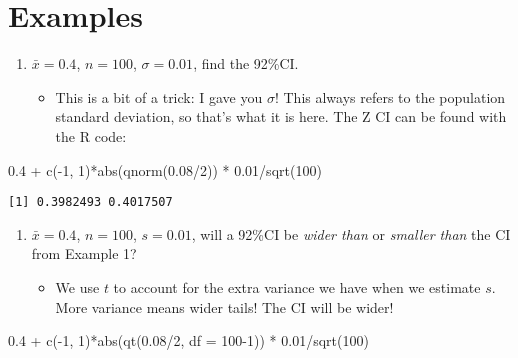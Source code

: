 \documentclass[
  letterpaper,
  DIV=11,
  numbers=noendperiod]{scrreprt}
\newenvironment{Shaded}{\begin{snugshade}}{\end{snugshade}}
\newcommand{\AttributeTok}[1]{\textcolor[rgb]{0.40,0.45,0.13}{#1}}
\newcommand{\DecValTok}[1]{\textcolor[rgb]{0.68,0.00,0.00}{#1}}
\newcommand{\FloatTok}[1]{\textcolor[rgb]{0.68,0.00,0.00}{#1}}
\newcommand{\FunctionTok}[1]{\textcolor[rgb]{0.28,0.35,0.67}{#1}}
\newcommand{\NormalTok}[1]{\textcolor[rgb]{0.00,0.23,0.31}{#1}}
\newcommand{\SpecialCharTok}[1]{\textcolor[rgb]{0.37,0.37,0.37}{#1}}
\providecommand{\tightlist}{%
  \setlength{\itemsep}{0pt}\setlength{\parskip}{0pt}}\usepackage{longtable,booktabs,array}
\begin{document}
\hypertarget{examples-5}{%
\section{Examples}\label{examples-5}}

\begin{enumerate}
\def\labelenumi{\arabic{enumi}.}
\tightlist
\item
  \(\bar x = 0.4\), \(n = 100\), \(\sigma = 0.01\), find the 92\%CI.

  \begin{itemize}
  \tightlist
  \item
    This is a bit of a trick: I gave you \(\sigma\)! This always refers
    to the population standard deviation, so that's what it is here. The
    Z CI can be found with the R code:
  \end{itemize}
\end{enumerate}

\begin{Shaded}
\begin{Highlighting}[]
\FloatTok{0.4} \SpecialCharTok{+} \FunctionTok{c}\NormalTok{(}\SpecialCharTok{{-}}\DecValTok{1}\NormalTok{, }\DecValTok{1}\NormalTok{)}\SpecialCharTok{*}\FunctionTok{abs}\NormalTok{(}\FunctionTok{qnorm}\NormalTok{(}\FloatTok{0.08}\SpecialCharTok{/}\DecValTok{2}\NormalTok{)) }\SpecialCharTok{*} \FloatTok{0.01}\SpecialCharTok{/}\FunctionTok{sqrt}\NormalTok{(}\DecValTok{100}\NormalTok{)}
\end{Highlighting}
\end{Shaded}

\begin{verbatim}
[1] 0.3982493 0.4017507
\end{verbatim}

\begin{enumerate}
\def\labelenumi{\arabic{enumi}.}
\setcounter{enumi}{1}
\tightlist
\item
  \(\bar x = 0.4\), \(n = 100\), \(s = 0.01\), will a 92\%CI be
  \emph{wider than} or \emph{smaller than} the CI from Example 1?

  \begin{itemize}
  \tightlist
  \item
    We use \(t\) to account for the extra variance we have when we
    estimate \(s\). More variance means wider tails! The CI will be
    wider!
  \end{itemize}
\end{enumerate}

\begin{Shaded}
\begin{Highlighting}[]
\FloatTok{0.4} \SpecialCharTok{+} \FunctionTok{c}\NormalTok{(}\SpecialCharTok{{-}}\DecValTok{1}\NormalTok{, }\DecValTok{1}\NormalTok{)}\SpecialCharTok{*}\FunctionTok{abs}\NormalTok{(}\FunctionTok{qt}\NormalTok{(}\FloatTok{0.08}\SpecialCharTok{/}\DecValTok{2}\NormalTok{, }\AttributeTok{df =} \DecValTok{100{-}1}\NormalTok{)) }\SpecialCharTok{*} \FloatTok{0.01}\SpecialCharTok{/}\FunctionTok{sqrt}\NormalTok{(}\DecValTok{100}\NormalTok{)}
\end{Highlighting}
\end{Shaded}
\end{document}
